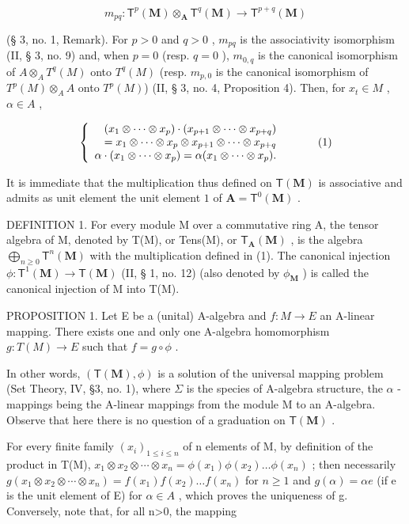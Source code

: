 \[
m _ {p q} \colon \mathsf {T} ^ {p} (\mathbf {M}) \otimes_ {\mathbf {A}} \mathsf {T} ^ {q} (\mathbf {M}) \rightarrow \mathsf {T} ^ {p + q} (\mathbf {M})
\]

(§ 3, no. 1, Remark). For \(p > 0\) and \(q > 0\) , \(m_{pq}\) is the associativity isomorphism (II, § 3, no. 9) and, when \(p = 0\) (resp. \(q = 0\) ), \(m_{0,q}\) is the canonical isomorphism of \(A \otimes_A T^q(M)\) onto \(T^q(M)\) (resp. \(m_{p,0}\) is the canonical isomorphism of \(T^p(M) \otimes_A A\) onto \(T^p(M)\)) (II, § 3, no. 4, Proposition 4). Then, for \(x_t \in M\) , \(\alpha \in A\) ,

\[
\left\{ \begin{array}{r l} (x _ {1} \otimes \dots \otimes x _ {p}) \cdot (x _ {p + 1} \otimes \dots \otimes x _ {p + q}) & \\ = x _ {1} \otimes \dots \otimes x _ {p} \otimes x _ {p + 1} \otimes \dots \otimes x _ {p + q} \\ \alpha \cdot (x _ {1} \otimes \dots \otimes x _ {p}) = \alpha (x _ {1} \otimes \dots \otimes x _ {p}). \end{array} \right.\tag{1}
\]

It is immediate that the multiplication thus defined on \(\mathsf{T}(\mathbf{M})\) is associative and admits as unit element the unit element \(1\) of \(\mathbf{A} = \mathsf{T}^0 (\mathbf{M})\) .

DEFINITION 1. For every module M over a commutative ring A, the tensor algebra of M, denoted by T(M), or Tens(M), or \(\mathsf{T}_{\mathbf{A}}(\mathbf{M})\) , is the algebra \(\bigoplus_{n\geqslant 0}\mathsf{T}^n (\mathbf{M})\) with the multiplication defined in (1). The canonical injection \(\phi :\mathsf{T}^{1}(\mathbf{M})\to \mathsf{T}(\mathbf{M})\) (II, § 1, no. 12) (also denoted by \(\phi_{\mathbf{M}}\) ) is called the canonical injection of M into T(M).

PROPOSITION 1. Let E be a (unital) A-algebra and \(f:M\to E\) an A-linear mapping. There exists one and only one A-algebra homomorphism \(g:T(M)\to E\) such that \(f=g\circ\phi\) .

In other words, \((\mathsf{T}(\mathbf{M}), \phi)\) is a solution of the universal mapping problem (Set Theory, IV, §3, no. 1), where \(\Sigma\) is the species of A-algebra structure, the \(\alpha\) -mappings being the A-linear mappings from the module M to an A-algebra. Observe that here there is no question of a graduation on \(\mathsf{T}(\mathbf{M})\) .

For every finite family \((x_{i})_{1\leqslant i\leqslant n}\) of n elements of M, by definition of the product in T(M), \(x_{1}\otimes x_{2}\otimes\cdots\otimes x_{n}=\phi(x_{1})\phi(x_{2})\ldots\phi(x_{n})\) ; then necessarily \(g(x_{1}\otimes x_{2}\otimes\cdots\otimes x_{n})=f(x_{1})f(x_{2})\ldots f(x_{n})\) for \(n\geqslant1\) and \(g(\alpha)=\alpha e\) (if e is the unit element of E) for \(\alpha\in A\) , which proves the uniqueness of g. Conversely, note that, for all n\textgreater0, the mapping

